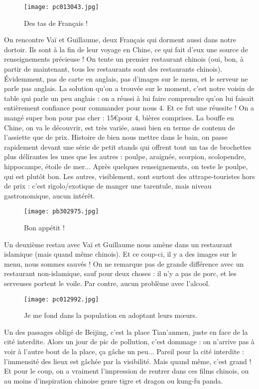 \documentclass{book}
\begin{document}
\begin{wrapfigure}{l}{0.55\textwidth}
\centering
\texttt{[image: pc013043.jpg]}
\caption*{ Des tas de Français !}
\end{wrapfigure}

On rencontre Vaï et Guillaume, deux Français qui dorment aussi dans notre dortoir. Ils sont à la fin de leur voyage en Chine, ce qui fait d'eux une source de renseignements précieuse ! On tente un premier restaurant chinois (oui, bon, à partir de maintenant, tous les restaurants sont des restaurants chinois). Évidemment, pas de carte en anglais, pas d'images sur le menu, et le serveur ne parle pas anglais. La solution qu'on a trouvée sur le moment, c'est notre voisin de table qui parle un peu anglais : on a réussi à lui faire comprendre qu'on lui faisait entièrement confiance pour commander pour nous 4. Et ce fut une réussite ! On a mangé super bon pour pas cher : 15\euro pour 4, bières comprises. La bouffe en Chine, on va le découvrir, est très variée, aussi bien en terme de contenu de l'assiette que de prix. Histoire de bien nous mettre dans le bain, on passe rapidement devant une série de petit stands qui offrent tout un tas de brochettes plus délirantes les unes que les autres : poulpe, araignée, scorpion, scolopendre, hippocampe, étoile de mer... Après quelques renseignements, on teste le poulpe, qui est plutôt bon. Les autres, visiblement, sont surtout des attrape-touristes hors de prix : c'est rigolo/exotique de manger une tarentule, mais niveau gastronomique, aucun intérêt.


\begin{figure}[H]
\centering
\texttt{[image: pb302975.jpg]}
\caption*{ Bon appétit !}
\end{figure}

Un deuxième restau avec Vaï et Guillaume nous amène dans un restaurant islamique (mais quand même chinois). Et ce coup-ci, il y a des images sur le menu, nous sommes sauvés ! On ne remarque pas de grande différence avec un restaurant non-islamique, sauf pour deux choses : il n'y a pas de porc, et les serveuses portent le voile. Par contre, aucun problème avec l'alcool.


\begin{figure}[H]
\centering
\texttt{[image: pc012992.jpg]}
\caption*{ Je me fond dans la population en adoptant leurs mœurs.}
\end{figure}

Un des passages obligé de Beijing, c'est la place Tian'anmen, juste en face de la cité interdite. Alors un jour de pic de pollution, c'est dommage : on n'arrive pas à voir à l'autre bout de la place, ça gâche un peu... Pareil pour la cité interdite : l'immensité des lieux est gâchée par la visibilité. Mais quand même, c'est grand ! Et pour le coup, on a vraiment l'impression de rentrer dans ces films chinois, ou au moins d'inspiration chinoise genre tigre et dragon ou kung-fu panda.
\end{document}
